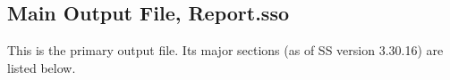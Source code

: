 

\subsection{Main Output File, Report.sso}
This is the primary output file.  Its major sections (as of SS version 3.30.16) are listed below.  

